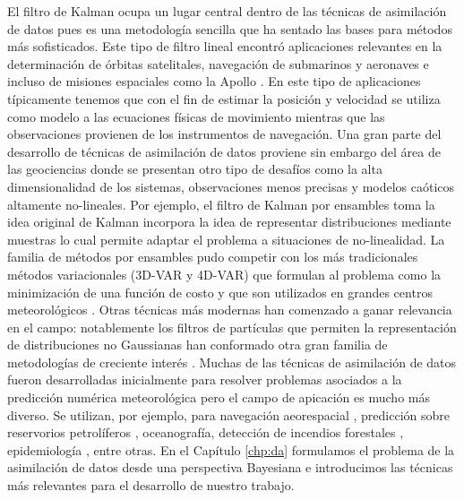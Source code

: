 El filtro de Kalman \citep{Kalman1960, Kalman1961} ocupa un lugar central dentro de las técnicas de asimilación de datos pues es una metodología sencilla que ha sentado las bases para métodos más sofisticados. Este tipo de filtro lineal encontró aplicaciones relevantes en la determinación de órbitas satelitales, navegación de submarinos y aeronaves e incluso de misiones espaciales como la Apollo \citep{Jazwinski1970}. En este tipo de aplicaciones típicamente tenemos que con el fin de estimar la posición y velocidad se utiliza como modelo a las ecuaciones físicas de movimiento mientras que las observaciones provienen de los instrumentos de navegación. Una gran parte del desarrollo de técnicas de asimilación de datos proviene sin embargo del área de las geociencias donde se presentan otro tipo de desafíos como la alta dimensionalidad de los sistemas, observaciones menos precisas y modelos caóticos altamente no-lineales. Por ejemplo, el filtro de Kalman por ensambles \citep{Evensen1994} toma la idea original de Kalman incorpora la idea de representar distribuciones mediante muestras lo cual permite adaptar el problema a situaciones de no-linealidad. La familia de métodos por ensambles pudo competir con los más tradicionales métodos variacionales (3D-VAR y 4D-VAR) que formulan al problema como la minimización de una función de costo y que son utilizados en grandes centros meteorológicos \citep{Kalnay2007}. Otras técnicas más modernas han comenzado a ganar relevancia en el campo: notablemente los filtros de partículas que permiten la representación de distribuciones no Gaussianas han conformado otra gran familia de metodologías de creciente interés \citep{vanLeeuwen2019}. Muchas de las técnicas de asimilación de datos fueron desarrolladas inicialmente para resolver problemas asociados a la predicción numérica meteorológica pero el campo de apicación es mucho más diverso. Se utilizan, por ejemplo, para navegación aeorespacial \cite{Grewal2010}, predicción sobre reservorios petrolíferos \cite{Aanonsen2009}, oceanografía, detección de incendios forestales \citep{Mandel2008}, epidemiología \citep{Shaman2012}, entre otras. En el Capítulo \ref{chp:da} formulamos el problema de la asimilación de datos desde una perspectiva Bayesiana e introducimos las técnicas más relevantes para el desarrollo de nuestro trabajo.


